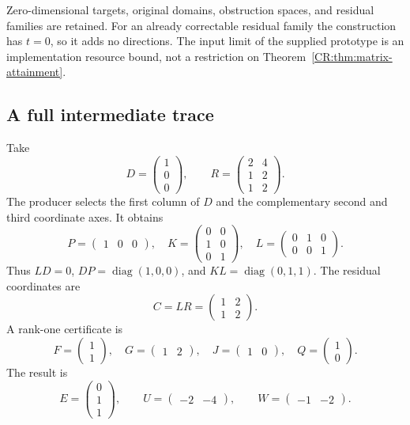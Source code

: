 Zero-dimensional targets, original domains, obstruction spaces, and residual families are retained. For an already correctable residual family the construction has $t=0$, so it adds no directions. The input limit of the supplied prototype is an implementation resource bound, not a restriction on Theorem~\ref{CR:thm:matrix-attainment}.

\subsection{A full intermediate trace}\label{CR:sec:matrix-worked}
Take
\[
 D=\begin{pmatrix}1\\0\\0\end{pmatrix},\qquad
 R=\begin{pmatrix}2&4\\1&2\\1&2\end{pmatrix}.
\]
The producer selects the first column of $D$ and the complementary second and third coordinate axes. It obtains
\[
 P=\begin{pmatrix}1&0&0\end{pmatrix},\quad
 K=\begin{pmatrix}0&0\\1&0\\0&1\end{pmatrix},\quad
 L=\begin{pmatrix}0&1&0\\0&0&1\end{pmatrix}.
\]
Thus $LD=0$, $DP=\operatorname{diag}(1,0,0)$, and $KL=\operatorname{diag}(0,1,1)$. The residual coordinates are
\[
 C=LR=\begin{pmatrix}1&2\\1&2\end{pmatrix}.
\]
A rank-one certificate is
\[
 F=\begin{pmatrix}1\\1\end{pmatrix},\quad
 G=\begin{pmatrix}1&2\end{pmatrix},\quad
 J=\begin{pmatrix}1&0\end{pmatrix},\quad
 Q=\begin{pmatrix}1\\0\end{pmatrix}.
\]
The result is
\[
 E=\begin{pmatrix}0\\1\\1\end{pmatrix},\qquad
 U=\begin{pmatrix}-2&-4\end{pmatrix},\qquad
 W=\begin{pmatrix}-1&-2\end{pmatrix}.
\]
